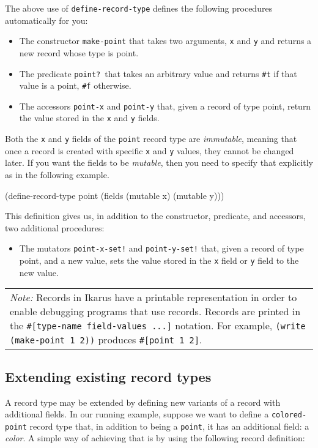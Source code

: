\documentclass[onecolumn, 12pt, twoside, openright, dvipdfm]{book}
\newcommand{\BoxedText}[2]{
  \vspace{.05in}
  \begin{center}
    \begin{tabular}{|p{4.6in}|} {\large \emph{#1}} #2 \end{tabular}
  \end{center}
  \vspace{.05in}
}
\begin{document}
The above use of \texttt{define-record-type} defines the following
procedures automatically for you:
\begin{itemize}
\item The constructor \texttt{make-point} that takes two arguments,
\texttt{x} and \texttt{y} and returns a new record whose type is
point.
\item The predicate \texttt{point?}\ that takes an arbitrary value
and returns \texttt{\#t} if that value is a point, \texttt{\#f}
otherwise. 
\item The accessors \texttt{point-x} and \texttt{point-y} that,
given a record of type point, return the value stored in the
\texttt{x} and \texttt{y} fields.
\end{itemize}

Both the \texttt{x} and \texttt{y} fields of the \texttt{point}
record type are \emph{immutable}, meaning that once a record is
created with specific \texttt{x} and \texttt{y} values, they cannot
be changed later.  If you want the fields to be \emph{mutable}, then
you need to specify that explicitly as in the following example.
\newpage

\begin{CodeInline}
(define-record-type point
  (fields (mutable x) (mutable y)))
\end{CodeInline}

This definition gives us, in addition to the constructor, predicate,
and accessors, two additional procedures:
\begin{itemize}
\item The mutators \texttt{point-x-set!} and \texttt{point-y-set!} that,
given a record of type point, and a new value, sets the value stored in the
\texttt{x} field or \texttt{y} field to the new value.
\end{itemize}


\BoxedText{Note:}{Records in Ikarus have a printable representation
in order to enable debugging programs that use records.  Records are
printed in the \texttt{\#[type-name field-values ...]} notation.
For example, \texttt{(write (make-point 1 2))} produces 
\texttt{\#[point 1 2]}.}

\subsection{Extending existing record types}

A record type may be extended by defining new variants of a record
with additional fields.  In our running example, suppose we want
to define a \texttt{colored-point} record type that, in addition to
being a \texttt{point}, it has an additional field: a \emph{color}.
A simple way of achieving that is by using the following record 
definition:
\end{document}
